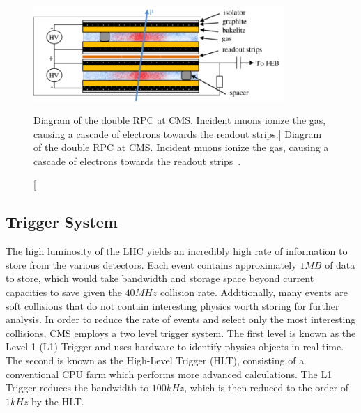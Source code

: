 \begin{figure}[htpb]
	\centering
	\includegraphics[width=0.85\textwidth]{figs/03_experiment/Design1.png}
	\caption
	[Diagram of the double RPC at CMS. Incident muons ionize the gas, causing a cascade of electrons towards the readout strips.]
	{Diagram of the double RPC at CMS. Incident muons ionize the gas, causing a cascade of electrons towards the readout strips~\cite{CMSRPC_HLLHC}.}
	\label{fig:RPC}
\end{figure}

\subsection{Trigger System} \label{sec:CMS_trig}
The high luminosity of the LHC yields an incredibly high rate of information to store from the various detectors. Each event contains approximately $1\unit{MB}$ of data to store, which would take bandwidth and storage space beyond current capacities to save given the $40\unit{MHz}$ collision rate. Additionally, many events are soft collisions that do not contain interesting physics worth storing for further analysis. In order to reduce the rate of events and select only the most interesting collisions, CMS employs a two level trigger system. The first level is known as the Level-1 (L1) Trigger and uses hardware to identify physics objects in real time. The second is known as the High-Level Trigger (HLT), consisting of a conventional CPU farm which performs more advanced calculations. The L1 Trigger reduces the bandwidth to $100\unit{kHz}$, which is then reduced to the order of $1\unit{kHz}$ by the HLT.

